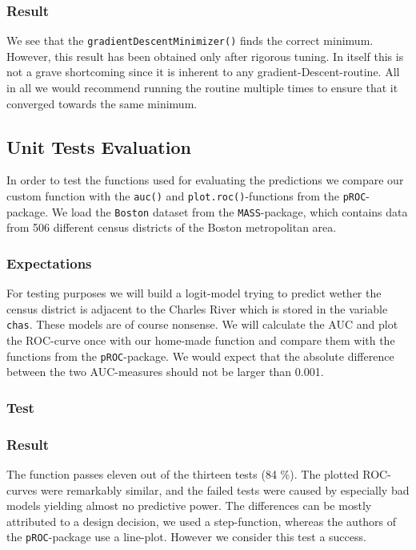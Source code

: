 \documentclass{article}
\begin{document}


\subsubsection{Result}

We see that the \texttt{gradientDescentMinimizer()} finds the correct minimum. However, this result has been obtained only after rigorous tuning. In itself this is not a grave shortcoming since it is inherent to any gradient-Descent-routine. All in all we would recommend running the routine multiple times to ensure that it converged towards the same minimum.

\subsection{Unit Tests Evaluation}

In order to test the functions used for evaluating the predictions we compare our custom function with the \texttt{auc()} and \texttt{plot.roc()}-functions from the \texttt{pROC}-package. We load the \texttt{Boston} dataset from the \texttt{MASS}-package, which contains data from 506 different census districts of the Boston metropolitan area. 

\subsubsection{Expectations}
For testing purposes we will build a logit-model trying to predict wether the census district is adjacent to the Charles River which is stored in the variable \texttt{chas}. These models are of course nonsense. We will calculate the AUC and plot the ROC-curve once with our home-made function and compare them with the functions from the \texttt{pROC}-package. We would expect that the absolute difference between the two AUC-measures should not be larger than 0.001.

\subsubsection{Test}


\subsubsection{Result}
The function passes eleven out of the thirteen tests (84 \%). The plotted ROC-curves were remarkably similar, and the failed tests were caused by especially bad models yielding almost no predictive power. The differences can be mostly attributed to a design decision, we used a step-function, whereas the authors of the \texttt{pROC}-package use a line-plot. However we consider this test a success.
\newpage
\end{document}
